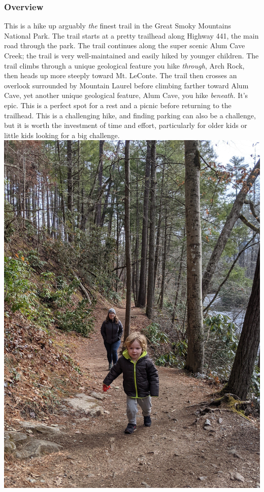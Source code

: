 \documentclass[
  letterpaper,
  DIV=11,
  numbers=noendperiod]{scrartcl}
\begin{document}
\hypertarget{overview-29}{%
\subsubsection{Overview}\label{overview-29}}

This is a hike up arguably \emph{the} finest trail in the Great Smoky
Mountains National Park. The trail starts at a pretty trailhead along
Highway 441, the main road through the park. The trail continues along
the super scenic Alum Cave Creek; the trail is very well-maintained and
easily hiked by younger children. The trail climbs through a unique
geological feature you hike \emph{through}, Arch Rock, then heads up
more steeply toward Mt. LeConte. The trail then crosses an overlook
surrounded by Mountain Laurel before climbing farther toward Alum Cave,
yet another unique geological feature, Alum Cave, you hike
\emph{beneath.} It's epic. This is a perfect spot for a rest and a
picnic before returning to the trailhead. This is a challenging hike,
and finding parking can also be a challenge, but it is worth the
investment of time and effort, particularly for older kids or little
kids looking for a big challenge.
\includegraphics{img/trail-28-figure-01.jpg}
\end{document}
